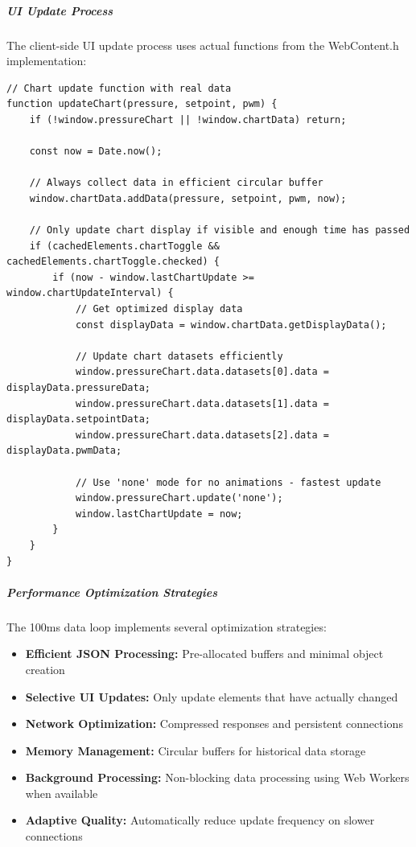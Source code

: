 \documentclass[12pt,a4paper]{article}
\begin{document}
\subparagraph{UI Update Process}
The client-side UI update process uses actual functions from the WebContent.h implementation:

\begin{lstlisting}[caption=Actual UI Update Functions from WebContent.h]
// Chart update function with real data
function updateChart(pressure, setpoint, pwm) {
    if (!window.pressureChart || !window.chartData) return;
    
    const now = Date.now();
    
    // Always collect data in efficient circular buffer
    window.chartData.addData(pressure, setpoint, pwm, now);
    
    // Only update chart display if visible and enough time has passed
    if (cachedElements.chartToggle && cachedElements.chartToggle.checked) {
        if (now - window.lastChartUpdate >= window.chartUpdateInterval) {
            // Get optimized display data
            const displayData = window.chartData.getDisplayData();
            
            // Update chart datasets efficiently
            window.pressureChart.data.datasets[0].data = displayData.pressureData;
            window.pressureChart.data.datasets[1].data = displayData.setpointData;
            window.pressureChart.data.datasets[2].data = displayData.pwmData;
            
            // Use 'none' mode for no animations - fastest update
            window.pressureChart.update('none');
            window.lastChartUpdate = now;
        }
    }
}
\end{lstlisting}


\subparagraph{Performance Optimization Strategies}
The 100ms data loop implements several optimization strategies:

\begin{itemize}
    \item \textbf{Efficient JSON Processing:} Pre-allocated buffers and minimal object creation
    \item \textbf{Selective UI Updates:} Only update elements that have actually changed
    \item \textbf{Network Optimization:} Compressed responses and persistent connections
    \item \textbf{Memory Management:} Circular buffers for historical data storage
    \item \textbf{Background Processing:} Non-blocking data processing using Web Workers when available
    \item \textbf{Adaptive Quality:} Automatically reduce update frequency on slower connections
\end{itemize}
\end{document}
